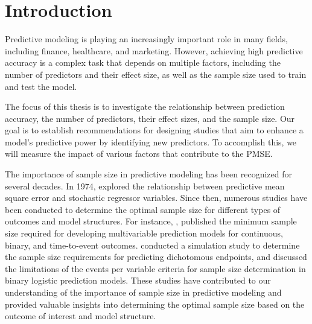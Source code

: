 \chapter{Introduction}

\noindent Predictive modeling is playing an increasingly important role in many fields, including finance, healthcare, and marketing. However, achieving high predictive accuracy is a complex task that depends on multiple factors, including the number of predictors and their effect size, as well as the sample size used to train and test the model. 

The focus of this thesis is to investigate the relationship between prediction accuracy, the number of predictors, their effect sizes, and the sample size. Our goal is to establish recommendations for designing studies that aim to enhance a model's predictive power by identifying new predictors. To accomplish this, we will measure the impact of various factors that contribute to the PMSE.

The importance of sample size in predictive modeling has been recognized for several decades. In 1974, \cite{narula1974predictive}explored the relationship between predictive mean square error and stochastic regressor variables. Since then, numerous studies have been conducted to determine the optimal sample size for different types of outcomes and model structures. For instance, \cite{riley2019minimum}, \cite{riley2019minimums}published the minimum sample size required for developing multivariable prediction models for continuous, binary, and time-to-event outcomes. \cite{van2014modern} conducted a simulation study to determine the sample size requirements for predicting dichotomous endpoints, and \cite{van2019sample} discussed the limitations of the events per variable criteria for sample size determination in binary logistic prediction models. These studies have contributed to our understanding of the importance of sample size in predictive modeling and provided valuable insights into determining the optimal sample size based on the outcome of interest and model structure. 


